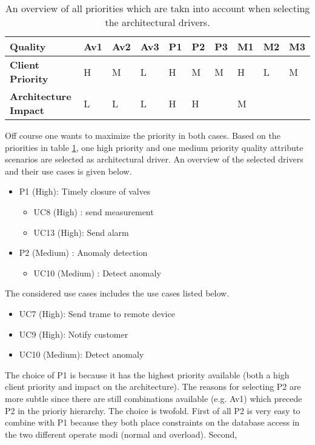 \begin{table}
	\begin{center}
		\begin{tabular}{| l | l | l | l | l | l | l | l | l | l |}
		\hline
		\textbf{Quality}			&	Av1	&	Av2	&	Av3	&	P1	&	P2	&	P3	&	M1	&	M2	&	M3	\\
		\hline
		\textbf{Client Priority}	&	H	&	M	&	L	&	H	&	M	&	M	&	H	&	L	&	M	\\
		\hline
		\textbf{Architecture Impact}&	L	&	L	&	L	&	H	&	H	&		&	M	&		&		\\
		\hline
		\end{tabular}
		\caption{An overview of all priorities which are takn into account when
		selecting the architectural drivers.}
		\label{table:add/it1/priorities}
	\end{center}
\end{table}

\npar Off course one wants to maximize the priority in both cases. Based on the
priorities in table \ref{table:add/it1/priorities}, one high priority and one medium
priority quality attribute scenarios are selected as architectural driver. An
overview of the selected drivers and their use cases is given below.

\begin{itemize}
  	\item P1 (High): Timely closure of valves
  	\begin{itemize}
  	  	\item UC8 (High) : send measurement
  		\item UC13 (High): Send alarm 
  	\end{itemize}
  	\item P2 (Medium) : Anomaly detection
  	\begin{itemize}
  	  \item UC10 (Medium) : Detect anomaly %
  	\end{itemize} 
\end{itemize}

\npar The considered use cases includes the use cases listed below. 

\begin{itemize}
	\item UC7 (High): Send trame to remote device
	\item UC9 (High): Notify customer
	\item UC10 (Medium): Detect anomaly
\end{itemize}

\npar The choice of P1 is because it has the highest priority available (both a
high client priority and impact on the architecture). The reasons for selecting
P2 are more subtle since there are still combinations available (e.g. Av1) which
precede P2 in the prioriy hierarchy. The choice is twofold. First of all P2 is
very easy to combine with P1 because they both place constraints on the database
access in the two different operate modi (normal and overload). Second, 

